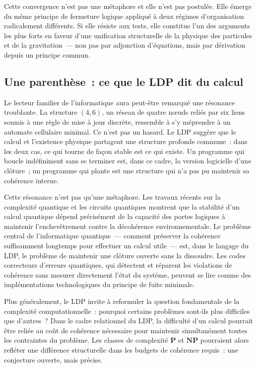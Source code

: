 \documentclass[12pt, a4paper, openright]{book}
\begin{document}
\medskip

Cette convergence n'est pas une métaphore et elle n'est pas postulée. Elle émerge du même principe de fermeture logique appliqué à deux régimes d'organisation radicalement différents. Si elle résiste aux tests, elle constitue l'un des arguments les plus forts en faveur d'une unification structurelle de la physique des particules et de la gravitation~--- non pas par adjonction d'équations, mais par dérivation depuis un principe commun.

\subsection*{Une parenthèse~: ce que le LDP dit du calcul}

Le lecteur familier de l'informatique aura peut-être remarqué une résonance troublante. La structure $(4,6)$, un réseau de quatre n\oe{}uds reliés par six liens soumis à une règle de mise à jour discrète, ressemble à s'y méprendre à un automate cellulaire minimal. Ce n'est pas un hasard. Le LDP suggère que le calcul et l'existence physique partagent une structure profonde commune~: dans les deux cas, ce qui \og tourne\fg{} de façon stable est ce qui \og existe\fg{}. Un programme qui boucle indéfiniment sans se terminer est, dans ce cadre, la version logicielle d'une clôture~; un programme qui plante est une structure qui n'a pas pu maintenir sa cohérence interne.

\medskip

Cette résonance n'est pas qu'une métaphore. Les travaux récents sur la complexité quantique et les circuits quantiques montrent que la stabilité d'un calcul quantique dépend précisément de la capacité des portes logiques à maintenir l'enchevêtrement contre la décohérence environnementale. Le problème central de l'informatique quantique~--- comment préserver la cohérence suffisamment longtemps pour effectuer un calcul utile~--- est, dans le langage du LDP, le problème de maintenir une clôture ouverte sans la dissoudre. Les codes correcteurs d'erreurs quantiques, qui détectent et réparent les violations de cohérence sans mesurer directement l'état du système, peuvent se lire comme des implémentations technologiques du principe de fuite minimale.

\medskip

\medskip

Plus généralement, le LDP invite à reformuler la question fondamentale de la complexité computationnelle~: pourquoi certains problèmes sont-ils plus difficiles que d'autres~? Dans le cadre relationnel du LDP, la difficulté d'un calcul pourrait être reliée au coût de cohérence nécessaire pour maintenir simultanément toutes les contraintes du problème. Les classes de complexité $\mathbf{P}$ et $\mathbf{NP}$ pourraient alors refléter une différence structurelle dans les budgets de cohérence requis~: une conjecture ouverte, mais précise.
\end{document}
